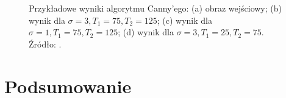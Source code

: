 \documentclass[a4paper,twocolumn,12pt]{article}
\begin{document}
\begin{figure}[!ht]
 \begin{center}
 \end{center}
 \caption{
  Przykładowe wyniki algorytmu Canny'ego:
  (a) obraz wejściowy;
  (b) wynik dla $\sigma = 3, T_1 = 75, T_2 = 125$;
  (c) wynik dla $\sigma = 1, T_1 = 75, T_2 = 125$;
  (d) wynik dla $\sigma = 3, T_1 = 25, T_2 = 75$.
  Źródło: \cite{boldak}.
 }
 \label{fig:canny_comparison}
\end{figure}



\section{Podsumowanie}
\end{document}
